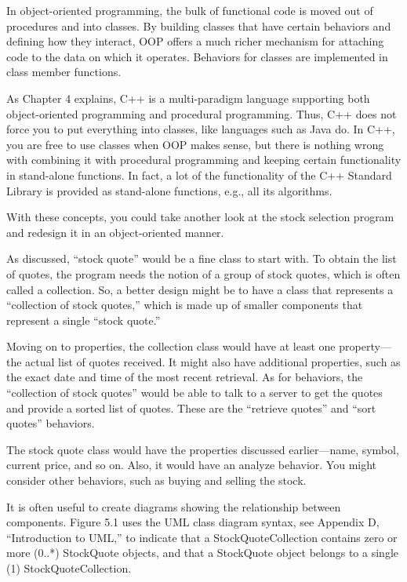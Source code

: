 In object-oriented programming, the bulk of functional code is moved out of procedures and into classes. By building classes that have certain behaviors and defining how they interact, OOP offers a much richer mechanism for attaching code to the data on which it operates. Behaviors for classes are implemented in class member functions.

As Chapter 4 explains, C++ is a multi-paradigm language supporting both object-oriented programming and procedural programming. Thus, C++ does not force you to put everything into classes, like languages such as Java do. In C++, you are free to use classes when OOP makes sense, but there is nothing wrong with combining it with procedural programming and keeping certain functionality in stand-alone functions. In fact, a lot of the functionality of the C++ Standard Library is provided as stand-alone functions, e.g., all its algorithms.


With these concepts, you could take another look at the stock selection program and redesign it in an object-oriented manner.

As discussed, “stock quote” would be a fine class to start with. To obtain the list of quotes, the program needs the notion of a group of stock quotes, which is often called a collection. So, a better design might be to have a class that represents a “collection of stock quotes,” which is made up of smaller components that represent a single “stock quote.”

Moving on to properties, the collection class would have at least one property—the actual list of quotes received. It might also have additional properties, such as the exact date and time of the most recent retrieval. As for behaviors, the “collection of stock quotes” would be able to talk to a server to get the quotes and provide a sorted list of quotes. These are the “retrieve quotes” and “sort quotes” behaviors.

The stock quote class would have the properties discussed earlier—name, symbol, current price, and so on. Also, it would have an analyze behavior. You might consider other behaviors, such as buying and selling the stock.

It is often useful to create diagrams showing the relationship between components. Figure 5.1 uses the UML class diagram syntax, see Appendix D, “Introduction to UML,” to indicate that a StockQuoteCollection contains zero or more (0..*) StockQuote objects, and that a StockQuote object belongs to a single (1) StockQuoteCollection.

